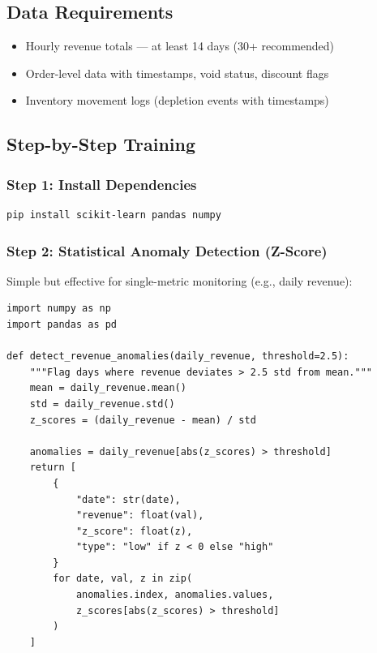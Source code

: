 \documentclass[12pt, a4paper]{article}
\begin{document}
\subsection{Data Requirements}
\begin{itemize}[nosep]
    \item Hourly revenue totals --- at least 14 days (30+ recommended)
    \item Order-level data with timestamps, void status, discount flags
    \item Inventory movement logs (depletion events with timestamps)
\end{itemize}


\subsection{Step-by-Step Training}

\subsubsection{Step 1: Install Dependencies}
\begin{lstlisting}[language=bash]
pip install scikit-learn pandas numpy
\end{lstlisting}

\subsubsection{Step 2: Statistical Anomaly Detection (Z-Score)}

Simple but effective for single-metric monitoring (e.g., daily revenue):

\begin{lstlisting}
import numpy as np
import pandas as pd

def detect_revenue_anomalies(daily_revenue, threshold=2.5):
    """Flag days where revenue deviates > 2.5 std from mean."""
    mean = daily_revenue.mean()
    std = daily_revenue.std()
    z_scores = (daily_revenue - mean) / std
    
    anomalies = daily_revenue[abs(z_scores) > threshold]
    return [
        {
            "date": str(date),
            "revenue": float(val),
            "z_score": float(z),
            "type": "low" if z < 0 else "high"
        }
        for date, val, z in zip(
            anomalies.index, anomalies.values,
            z_scores[abs(z_scores) > threshold]
        )
    ]
\end{lstlisting}
\end{document}
